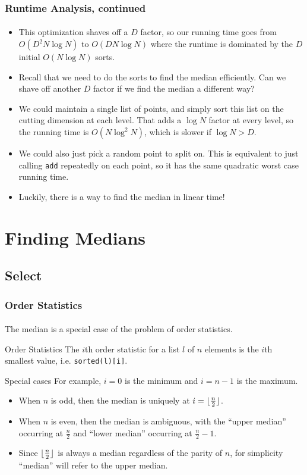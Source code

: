 \documentclass{beamer}                             %
\DeclarePairedDelimiter\floor{\lfloor}{\rfloor}
\begin{document}
\begin{frame}
\frametitle{Runtime Analysis, continued}
\framesubtitle{}
\begin{itemize}[<+->]
  \item This optimization shaves off a \( D \) factor, so our running
    time goes from \( O(D^2 N \log N) \) to \( O(D N \log N) \) where the
    runtime is dominated by the \( D \) initial \( O(N \log N) \) sorts.
  \item Recall that we need to do the sorts to find the
    median efficiently. Can we shave off another \( D \)
    factor if we find the median a different way?
  \item We could maintain a single list of points, and simply sort this
    list on the cutting dimension at each level. That adds a \( \log N \)
    factor at every level, so the running time is \( O(N \log^2 N) \),
    which is slower if \( \log N > D \).
  \item We could also just pick a random point to split on. This is
    equivalent to just calling \texttt{add} repeatedly on each point,
    so it has the same quadratic worst case running time.
  \item Luckily, there is a way to find the median in linear time!
\end{itemize}
\end{frame}

\section{Finding Medians}
\subsection{Select}

\begin{frame}
\frametitle{Order Statistics}
\framesubtitle{}
The median is a special case of the problem of \alert{order statistics}.

\begin{block}{Order Statistics}
  The \( i \)th order statistic for a list \( l \) of \( n \) elements
  is the \( i \)th smallest value, i.e. \texttt{sorted(l)[i]}.
\end{block} \pause

\begin{exampleblock}{Special cases}
  For example, \( i = 0 \) is the minimum and \( i = n - 1 \) is the maximum.
\end{exampleblock} \pause
\begin{itemize}
  \item When \( n \) is odd, then the median is
    uniquely at \( i = \floor{\frac{n}{2}} \).
  \item When \( n \) is even, then the median is ambiguous, with the
    \enquote{upper median} occurring at \( \frac{n}{2} \) and
    \enquote{lower median} occurring at \( \frac{n}{2} - 1 \). \pause
  \item Since \( \floor{\frac{n}{2}} \) is always a median
    regardless of the parity of \( n \), for simplicity
    \enquote{median} will refer to the upper median.
\end{itemize}
\end{frame}
\end{document}
